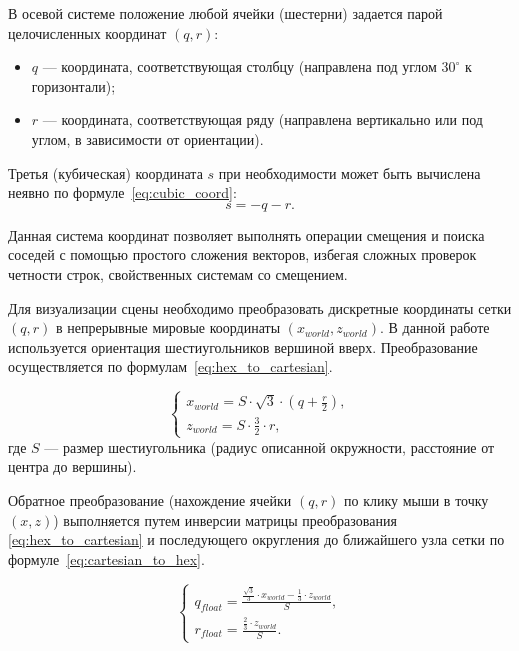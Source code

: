В осевой системе положение любой ячейки (шестерни) задается парой целочисленных координат $(q, r)$:
\begin{itemize}
	\item $q$ --- координата, соответствующая столбцу (направлена под углом $30^\circ$ к горизонтали);
	\item $r$ --- координата, соответствующая ряду (направлена вертикально или под углом, в зависимости от ориентации).
\end{itemize}

Третья (кубическая) координата $s$ при необходимости может быть вычислена неявно по формуле~\eqref{eq:cubic_coord}:
\begin{equation}
	s = -q - r.
	\label{eq:cubic_coord}
\end{equation}

Данная система координат позволяет выполнять операции смещения и поиска соседей с помощью простого сложения векторов, избегая сложных проверок четности строк, свойственных системам со смещением.

Для визуализации сцены необходимо преобразовать дискретные координаты сетки $(q, r)$ в непрерывные мировые координаты $(x_{world}, z_{world})$. В данной работе используется ориентация шестиугольников вершиной вверх. Преобразование осуществляется по формулам~\eqref{eq:hex_to_cartesian}.

\begin{equation}
	\label{eq:hex_to_cartesian}
	\begin{cases}
		x_{world} = S \cdot \sqrt{3} \cdot \left( q + \frac{r}{2} \right), \\
		z_{world} = S \cdot \frac{3}{2} \cdot r,
	\end{cases}
\end{equation}
где $S$ --- размер шестиугольника (радиус описанной окружности, расстояние от центра до вершины).

Обратное преобразование (нахождение ячейки $(q, r)$ по клику мыши в точку $(x, z)$) выполняется путем инверсии матрицы преобразования \eqref{eq:hex_to_cartesian} и последующего округления до ближайшего узла сетки по формуле~\eqref{eq:cartesian_to_hex}.

\begin{equation}
	\begin{cases}
		q_{float} = \frac{\frac{\sqrt{3}}{3} \cdot x_{world} - \frac{1}{3} \cdot z_{world}}{S}, \\
		r_{float} = \frac{\frac{2}{3} \cdot z_{world}}{S}.
	\end{cases}
	\label{eq:cartesian_to_hex}
\end{equation}

